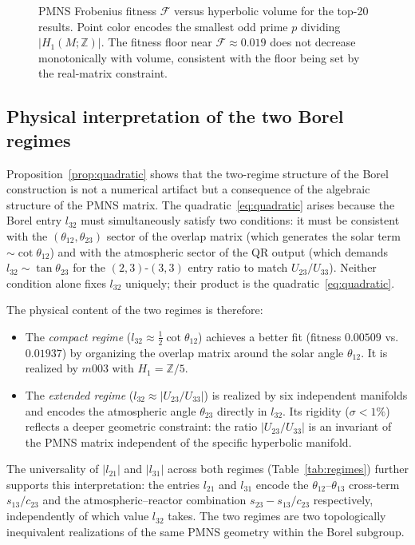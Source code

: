 \documentclass[11pt,a4paper]{article}
\begin{document}
\begin{figure}[!t]
\centering
\caption{PMNS Frobenius fitness $\mathcal{F}$ versus hyperbolic volume
for the top-20 results. Point color encodes the smallest odd prime $p$
dividing $|H_1(M;\mathbb{Z})|$. The fitness floor near
$\mathcal{F} \approx 0.019$ does not decrease monotonically with volume,
consistent with the floor being set by the real-matrix constraint.}
\label{fig:floor_volume}
\end{figure}




\subsection{Physical interpretation of the two Borel regimes}
\label{sec:discuss_regimes}
 
Proposition~\ref{prop:quadratic} shows that the two-regime structure
of the Borel construction is not a numerical artifact but a
consequence of the algebraic structure of the PMNS matrix.
The quadratic~\eqref{eq:quadratic} arises because the Borel
entry $l_{32}$ must simultaneously satisfy two conditions:
it must be consistent with the $(\theta_{12}, \theta_{23})$ sector
of the overlap matrix (which generates the solar term
$\sim\cot\theta_{12}$) and with the atmospheric sector of the
QR output (which demands $l_{32} \sim \tan\theta_{23}$ for the
$(2,3)$-$(3,3)$ entry ratio to match $U_{23}/U_{33}$).
Neither condition alone fixes $l_{32}$ uniquely; their product is
the quadratic~\eqref{eq:quadratic}.
 
The physical content of the two regimes is therefore:
\begin{itemize}
\item The \emph{compact regime} ($l_{32} \approx \tfrac{1}{2}\cot\theta_{12}$)
achieves a better fit (fitness $0.00509$ vs.\ $0.01937$) by
organizing the overlap matrix around the solar angle $\theta_{12}$.
It is realized by $m003$ with $H_1 = \mathbb{Z}/5$.
\item The \emph{extended regime} ($l_{32} \approx |U_{23}/U_{33}|$)
is realized by six independent manifolds and encodes the atmospheric
angle $\theta_{23}$ directly in $l_{32}$. Its rigidity ($\sigma < 1\%$)
reflects a deeper geometric constraint: the ratio $|U_{23}/U_{33}|$
is an invariant of the PMNS matrix independent of the specific
hyperbolic manifold.
\end{itemize}
 
The universality of $|l_{21}|$ and $|l_{31}|$ across both regimes
(Table~\ref{tab:regimes}) further supports this interpretation:
the entries $l_{21}$ and $l_{31}$ encode the $\theta_{12}$--$\theta_{13}$
cross-term $s_{13}/c_{23}$ and the atmospheric--reactor combination
$s_{23} - s_{13}/c_{23}$ respectively, independently of which
value $l_{32}$ takes.
The two regimes are two topologically inequivalent realizations of
the same PMNS geometry within the Borel subgroup.
\end{document}
